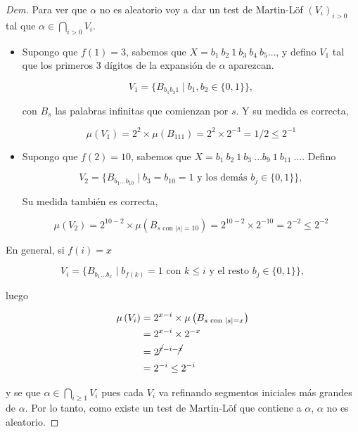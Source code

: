 \documentclass{article}
\theoremstyle{definition} %
\newcommand{\measure}[1]{\mu\left(#1\right)}
\begin{document}
\begin{proof}[Dem]
    Para ver que $\alpha$ no es aleatorio voy a dar un test de Martin-Löf
    $(V_i)_{i > 0}$ tal que $\alpha \in \bigcap_{i > 0} V_i$.

    \begin{itemize}
        \item Supongo que $f(1) = 3$, sabemos que $X = b_1\ b_2\ 1\ b_3\ b_4\ b_5
        \dots$, y defino $V_1$ tal que los primeros 3 dígitos de la expansión de
        $\alpha$ aparezcan.

        \[
            V_1 = \{ 
                B_{b_1 b_2 1}
                \mid b_1, b_2 \in \{0, 1\}
            \},
        \]

        con $B_s$ las palabras infinitas que comienzan por $s$. Y su medida es
        correcta,

        \[
            \measure{V_1}
                = 2^2 \times \measure{B_{111}}
                = 2^2 \times 2^{-3} = 1/2
                \leq 2^{-1}
        \]

        \item Supongo que $f(2) = 10$, sabemos que 
        $X = b_1\ b_2\ 1\ b_3\ \dots b_9\ 1\ b_{11}\ \dots$. Defino

        \[
            V_2 = \{ 
                B_{b_1 \dots b_{10}}
                \mid b_3 = b_{10} = 1 \text{ y los demás } b_j \in \{0, 1\}
            \},
        \]

        Su medida también es correcta,

        \[
            \measure{V_2}
                = 2^{10 - 2} \times \measure{B_{s \text{ con } |s| = 10}}
                = 2^{10 - 2} \times 2^{-10} = 2^{-2}
                \leq 2^{-2}
        \]
    \end{itemize}

    En general, si $f(i) = x$

    \[
        V_i = \{ 
            B_{b_1 \dots b_{x}}
            \mid b_{f(k)} = 1 \text{ con } k \leq i \text{ y el resto } b_j \in \{0, 1\}
        \},
    \]

    luego

    \begin{align*}
        \measure{V_i}
            &= 2^{x - i} \times \measure{B_{s \text{ con } |s| = x}} \\
            &= 2^{x - i} \times 2^{-x} \\
            &= 2^{\cancel{x} - i - \cancel{x}} \\
            &= 2^{-i} \leq 2^{-i}
    \end{align*}

    y se que $\alpha \in \bigcap_{i \geq 1} V_i$ pues cada $V_i$ va refinando
    segmentos iniciales más grandes de $\alpha$. Por lo tanto, como existe un
    test de Martin-Löf que contiene a $\alpha$, $\alpha$ no es aleatorio.
\end{proof}
\end{document}
